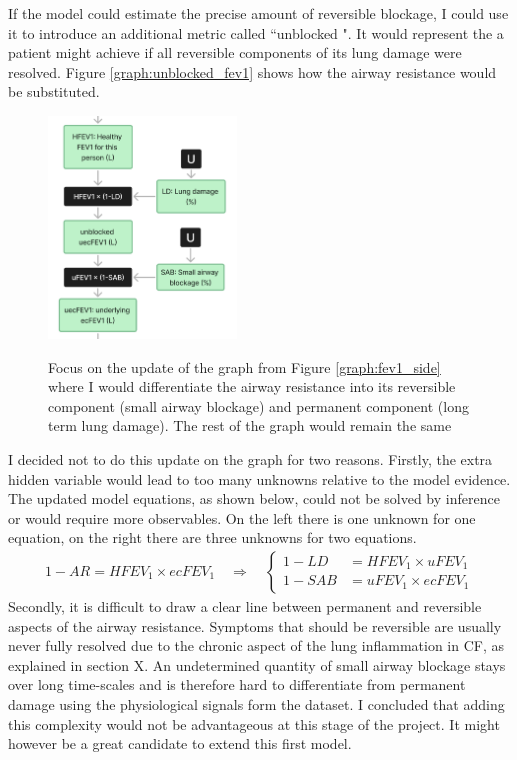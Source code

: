 If the model could estimate the precise amount of reversible blockage, I could use it to introduce an additional metric called “unblocked \F". It would represent the \F a patient might achieve if all reversible components of its lung damage were resolved. Figure \ref{graph:unblocked_fev1} shows how the airway resistance would be substituted. 
\begin{figure}[!h]
    \caption{Focus on the update of the graph from Figure \ref{graph:fev1_side} where I would differentiate the airway resistance into its reversible component (small airway blockage) and permanent component (long term lung damage). The rest of the graph would remain the same}
    \centering
    \includegraphics[width=50mm]{Chapter1/Figs/unblocked_fev1_model_structure.png}
    \label{graph:unblocked_\F}
\end{figure}
I decided not to do this update on the graph for two reasons. Firstly, the extra hidden variable would lead to too many unknowns relative to the model evidence. The updated model equations, as shown below, could not be solved by inference or would require more observables. On the left there is one unknown for one equation, on the right there are three unknowns for two equations.
\begin{align*}
1-AR = H\!F\!EV_1 \times ecF\!EV_1 \quad \Rightarrow \quad 
\left\{
\begin{aligned}
1-LD &= H\!F\!EV_1 \times uF\!EV_1 \\
1-SAB &= uF\!EV_1 \times ecF\!EV_1
\end{aligned}
\right.
\end{align*}
Secondly, it is difficult to draw a clear line between permanent and reversible aspects of the airway resistance. Symptoms that should be reversible are usually never fully resolved due to the chronic aspect of the lung inflammation in CF, as explained in section X. An undetermined quantity of small airway blockage stays over long time-scales and is therefore hard to differentiate from permanent damage using the physiological signals form the dataset. I concluded that adding this complexity would not be advantageous at this stage of the project. It might however be a great candidate to extend this first model.

